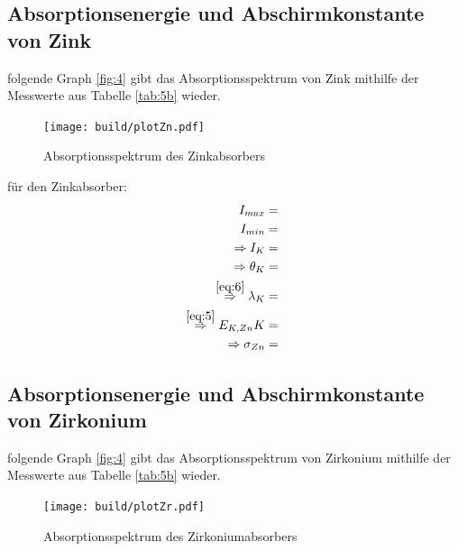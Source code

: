 \subsection{Absorptionsenergie und Abschirmkonstante von Zink}

    \justifying folgende Graph \ref{fig:4} gibt das Absorptionsspektrum von Zink mithilfe der Messwerte aus Tabelle \ref{tab:5b} 
    wieder.

    \begin{figure}[H]
        \centering
        \texttt{[image: build/plotZn.pdf]}
        \caption{Absorptionsspektrum des Zinkabsorbers}
        \label{fig:8}
    \end{figure}

    \justifying für den Zinkabsorber:
    \begin{subequations}\label{eq:25}
    \begin{align}
        I_{max} &= \text{} \label{eq:25a}\\
        I_{min} &= \text{} \label{eq:25b}\\
        \Rightarrow I_K &= \text{} \label{eq:25c}\\
        \Rightarrow \theta_K &= \text{} \label{eq:25d}\\
        \stackrel{\eqref{eq:6}}{\Rightarrow} \lambda_K &= \text{} \label{eq:25e}\\
        \stackrel{\eqref{eq:5}}{\Rightarrow} E_{K,Zn}K &= \text{} \label{eq:25f}\\
        \Rightarrow \sigma_{Zn} &= \text{} \label{eq:25g}
    \end{align}
    \end{subequations}

\subsection{Absorptionsenergie und Abschirmkonstante von Zirkonium}

    \justifying folgende Graph \ref{fig:4} gibt das Absorptionsspektrum von Zirkonium mithilfe der Messwerte aus Tabelle \ref{tab:5b} 
    wieder.

    \begin{figure}[H]
        \centering
        \texttt{[image: build/plotZr.pdf]}
        \caption{Absorptionsspektrum des Zirkoniumabsorbers}
        \label{fig:9}
    \end{figure}


